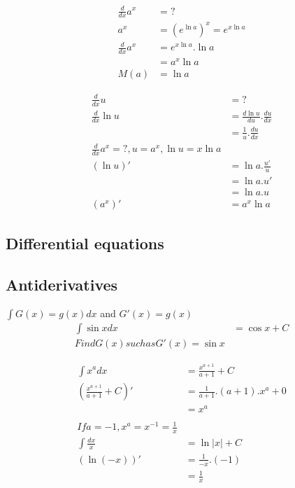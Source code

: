 \documentclass{article}
\begin{document}
    \begin{align*}
        \frac{d}{dx} a^x &= ?\\
        a^x &= (e^{\ln a})^x = e^{x\ln a}\\
        \frac{d}{dx} a^x &= e^{x\ln a} . \ln a\\
        &= a^x \ln a\\
        M(a) &= \ln a
    \end{align*}

    \begin{align*}
        \frac{d}{dx} u &= ?\\
        \frac{d}{dx} \ln u &= \frac{d \ln u}{du} . \frac{du}{dx} \\
        &= \frac{1}{u}.\frac{du}{dx}\\
        \frac{d}{dx} a^x = ? , u = a^x , \ln u = x\ln a \\
        (\ln u)' &= \ln a. \frac{u'}{u}\\
        &= \ln a . u'\\
        &= \ln a .u \\
        (a^x)' &= a^x \ln a
    \end{align*}

    \subsection{Differential equations}

    \subsection{Antiderivatives}
    \label{sub:Antiderivatives}

    $\int G(x)= g(x)dx $ and $G'(x)=g(x)$\\

    \begin{align*}
        \int \sin x dx &= \cos x + C\\
        Find G(x) such as G'(x)= \sin x
    \end{align*}

    \begin{align*}
        \int x^a dx &= \frac{x^{a+1}}{a+1}+C\\
        (\frac{x^{a+1}}{a+1}+C)' &= \frac{1}{a+1}.(a+1).x^a + 0\\
        &= x^a\\
        ~\\
        If a = -1, x^a = x^{-1} = \frac{1}{x}\\
        \int \frac{dx}{x} &= \ln |x| + C\\
        (\ln(-x))' &= \frac{1}{-x}.(-1)\\
        &= \frac{1}{x}
    \end{align*}
\end{document}
